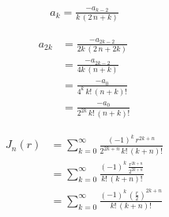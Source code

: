 \begin{refsection}
\begin{align}
	a_k
	=
	\frac
	{
		-a_{k - 2}
	}{
		k \, \left( 2 \, n + k \right)	
	}
	\label{eq:bessel_koeffreq}
\end{align}


\begin{align*}
	a_{2k}
	&=
	\frac
	{
		-a_{2k - 2}
	}{
		2k \, \left( 2 \, n + 2k \right)	
	} \\
	&=
	\frac
	{
		-a_{2k - 2}
	}{
		4k \, \left( n + k \right)	
	} \\
	&=
	\frac
	{
		-a_0
	}{
		4^k \, {k}! \, {\left( n + k \right)}!
	} \\
	&=
	\frac
	{
		-a_0
	}{
		2^{2k} \, {k}! \, {\left( n + k \right)}!
	}
\end{align*}


\begin{align}
	J_n \left( r \right)
	&= \nonumber
	\sum_{k=0} ^{\infty}
	\frac
	{
		\left( - 1 \right) ^k \, r ^{2k+n}
	}{
		2^{2k+n} \, {k}! \, { \left( k + n \right) }!
	} \\
	&= \nonumber
	\sum_{k=0} ^{\infty}
	\frac
	{
		\left( - 1 \right) ^k \, 
		\frac
		{
			r ^{2k+n}
		}{
			2^{2k+n}
		}
	}{
		{k}! \, { \left( k + n \right) }!
	} \\
	&=
	\sum_{k=0} ^{\infty}
	\frac
	{
		\left( - 1 \right) ^k \, 
		\left(		
		\frac
		{
			r
		}{
			2
		} \right) ^{2k+n}
	}{
		{k}! \, { \left( k + n \right) }!
	}
	\label{eq:bessel_summenformel}
\end{align}




\end{refsection}
